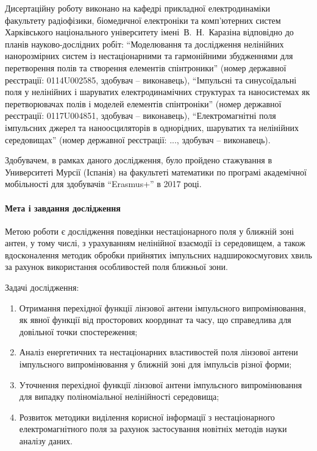 Дисертаційну роботу виконано на кафедрі прикладної електродинаміки факультету 
радіофізики, біомедичної електроніки та комп’ютерних систем Харківського 
національного університету імені~В.~Н.~Каразіна відповідно до планів 
науково-дослідних робіт: ``Моделювання та дослідження 
нелінійних нанорозмірних систем із нестаціонарними та гармонійними 
збудженнями для перетворення полів та створення елементів спінтроники'' 
(номер державної реєстрації: 0114U002585, здобувач -- виконавець), 
``Імпульсні та синусоїдальні поля у нелінійних і шаруватих електродинамічних 
структурах та наносистемах як перетворювачах полів і моделей елементів 
спінтроніки'' (номер державної реєстрації: 0117U004851, здобувач -- виконавець),
``Електромагнітні поля імпульсних джерел та наноосциляторів в однорідних, 
шаруватих та нелінійних середовищах'' (номер державної реєстрації: ..., 
здобувач -- виконавець).

Здобувачем, в рамках даного дослідження, було пройдено стажування в 
Университеті Мурсії (Іспанія) на факультеті математики по програмі 
академічної мобільності для здобувачів ``Erasmus+'' в 2017 році.

\paragraph{Мета і завдання дослідження}

Метою роботи є дослідження поведінки нестаціонарного поля у ближній зоні антен, 
у тому числі, з урахуванням нелінійної взаємодії із середовищем, а також 
вдосконалення методик обробки прийнятих імпульсних надширокосмугових хвиль за 
рахунок використання особливостей поля ближньої зони.

Задачі дослідження:

\begin{enumerate}

\item Отримання перехідної функції лінзової антени імпульсного 
випромінювання, як явної функції від просторових координат та часу, що 
справедлива для довільної точки спостереження;

\item Аналіз енергетичних та нестаціонарних властивостей поля лінзової антени 
імпульсного випромінювання у ближній зоні для імпульсів різної форми;

\item Уточнення перехідної функції лінзової антени імпульсного 
випромінювання для випадку поліноміальної нелінійності середовища;


\item Розвиток методики виділення корисної інформації з нестаціонарного 
електромагнітного поля за рахунок застосування новітніх методів науки аналізу 
даних.

\end{enumerate}


